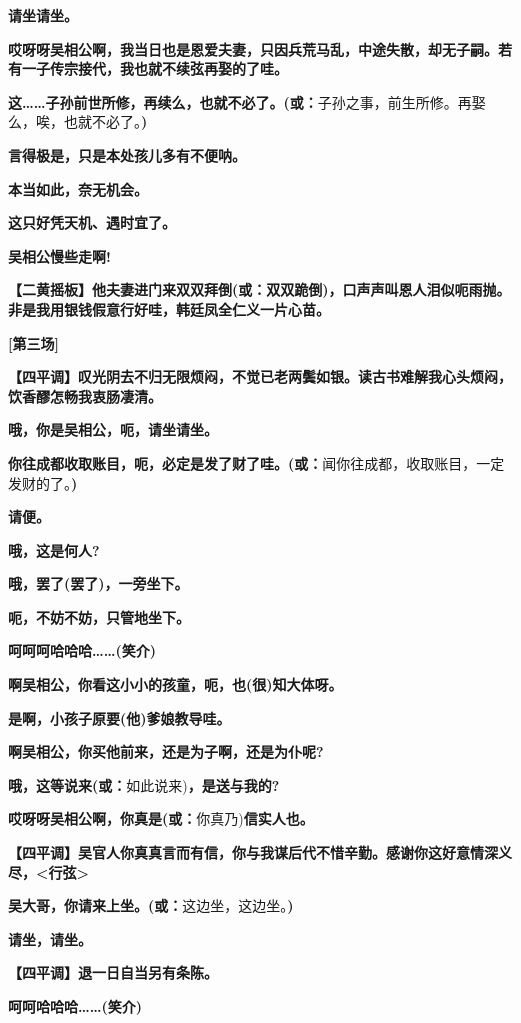 \textbf{请坐请坐。}

\textbf{哎呀呀吴相公啊，我当日也是恩爱夫妻，只因兵荒马乱，中途失散，却无子嗣。若有一子传宗接代，我也就不续弦再娶的了哇。}

\textbf{这\ldots{}\ldots{}子孙前世所修，再续么，也就不必了。(或：}子孙之事，前生所修。再娶么，唉，也就不必了。\textbf{)}

\textbf{言得极是，只是本处孩儿多有不便呐。}

\textbf{本当如此，奈无机会。}

\textbf{这只好凭天机、遇时宜了。}

\textbf{吴相公慢些走啊!}

\textbf{【二黄摇板】他夫妻进门来双双拜倒(或：双双跪倒)，口声声叫恩人泪似呃雨抛。非是我用银钱假意行好哇，韩廷凤全仁义一片心苗。}

\textbf{{[}第三场{]}}

\textbf{【四平调】叹光阴去不归无限烦闷，不觉已老两鬓如银。读古书难解我心头烦闷，饮香醪怎畅我衷肠凄清。}

\textbf{哦，你是吴相公，呃，请坐请坐。}

\textbf{你往成都收取账目，呃，必定是发了财了哇。(或：}闻你往成都，收取账目，一定发财的了。\textbf{)}

\textbf{请便。}

\textbf{哦，这是何人?}

\textbf{哦，罢了(罢了)，一旁坐下。}

\textbf{呃，不妨不妨，只管地坐下。}

\textbf{呵呵呵哈哈哈\ldots{}\ldots{}(笑介)}

\textbf{啊吴相公，你看这小小的孩童，呃，也(很)知大体呀。}

\textbf{是啊，小孩子原要(他)爹娘教导哇。}

\textbf{啊吴相公，你买他前来，还是为子啊，还是为仆呢?}

\textbf{哦，这等说来(或：}如此说来)\textbf{，是送与我的?}

\textbf{哎呀呀吴相公啊，你真是(或：}你真乃)\textbf{信实人也。}

\textbf{【四平调】吴官人你真真言而有信，你与我谋后代不惜辛勤。感谢你这好意情深义尽，\textless{}行弦\textgreater{}}

\textbf{吴大哥，你请来上坐。(或：}这边坐，这边坐。\textbf{)}

\textbf{请坐，请坐。}

\textbf{【四平调】退一日自当另有条陈。}

\textbf{呵呵哈哈哈\ldots{}\ldots{}(笑介)}

